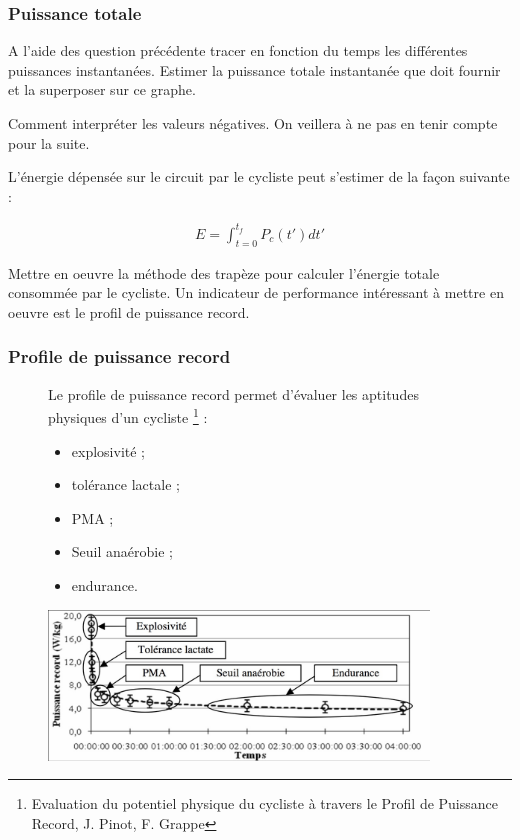 \subsubsection{Puissance totale}

\question{} A l'aide des question précédente tracer en fonction du temps les différentes puissances instantanées. Estimer la puissance totale instantanée que doit fournir et la superposer sur ce graphe.

\question{} Comment interpréter les valeurs négatives. On veillera à ne pas en tenir compte pour la suite.

L'énergie dépensée sur le circuit par le cycliste peut s'estimer de la façon suivante : 

\begin{align*}
E=\displaystyle{\int_{t=0}^{t_f}P_c(t')dt'}
\end{align*}

\question{} Mettre en oeuvre la méthode des trapèze pour calculer l'énergie totale consommée par le cycliste.
Un indicateur de performance intéressant à mettre en oeuvre est le profil de puissance record.

\subsubsection{Profile de puissance record}



\begin{figure}[!htb]
\begin{minipage}{0.5\textwidth}
Le profile de puissance record permet d'évaluer les aptitudes physiques d'un cycliste \footnote{Evaluation du potentiel physique du cycliste à travers le Profil de Puissance Record, J. Pinot, F. Grappe}  : 
\begin{itemize}
\item explosivité ;
\item tolérance lactale ;
\item PMA ;
\item Seuil anaérobie ;
\item endurance.
\end{itemize}
\end{minipage}
\begin{minipage}{0.5\textwidth}
\begin{center}
\includegraphics[width=0.9\textwidth]{PPR.jpg}
\caption{\label{PPR}}
\end{center}
\end{minipage}
\end{figure}

